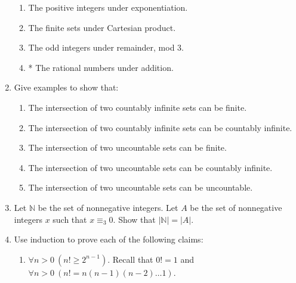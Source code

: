 \documentclass[10pt]{article}
\newcommand{\card}[1]{\left| #1 \right|}
\newcommand{\nat}{\mathbb{N}}
\begin{document}
\begin{enumerate}
\begin{enumerate}
\item
The positive integers under exponentiation.

\item
The finite sets under Cartesian product.

\item
The odd integers under remainder, mod 3.

\item
* The rational numbers under addition.
\end{enumerate}


\item
Give examples to show that:
\begin{enumerate}

\item
The intersection of two countably infinite sets can be finite.

\item
The intersection of two countably infinite sets can be countably infinite.

\item
The intersection of two uncountable sets can be finite.

\item
The intersection of two uncountable sets can be countably infinite.

\item
The intersection of two uncountable sets can be uncountable.
\end{enumerate}



\addtocounter{enumi}{2}
\item
Let $\nat$ be the set of nonnegative integers.  Let $A$ be the set of nonnegative integers $x$ such that $x \equiv _3 0$.  Show that $\card{\nat} = \card{A}$.




\addtocounter{enumi}{3}
\item
Use induction to prove each of the following claims:
\begin{enumerate}
\addtocounter{enumii}{1}

\item
$\forall n > 0 \> (n! \geq 2^{n-1})$.  Recall that $0! = 1$ and $\forall n > 0 \> (n! = n(n-1)(n-2) \ldots 1)$.

\end{enumerate}


\end{enumerate}
\end{document}
